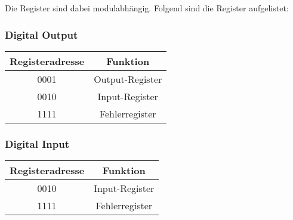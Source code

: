 Die Register sind dabei modulabhängig. Folgend sind die Register aufgelistet:

\subsubsection{Digital Output}
\begin{table}[H]
    \centering
        \begin{tabular}{|c|c|}
            \hline
            Registeradresse & Funktion \\ \hline \hline
            0001 & Output-Register \\ \hline
            0010 & Input-Register \\ \hline
            1111 & Fehlerregister \\ \hline
        \end{tabular}
\end{table}

\subsubsection{Digital Input}
\begin{table}[H]
    \centering
        \begin{tabular}{|c|c|}
            \hline
            Registeradresse & Funktion \\ \hline \hline
            0010 & Input-Register \\ \hline
            1111 & Fehlerregister \\ \hline
        \end{tabular}
\end{table}

